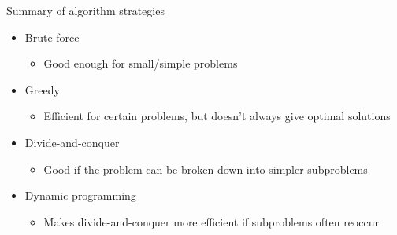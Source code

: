 \begin{frame}{Summary of algorithm strategies}
	\begin{itemize}
		\pause\item Brute force
			\begin{itemize}
				\pause\item Good enough for small/simple problems
			\end{itemize}
		\pause\item Greedy
			\begin{itemize}
				\pause\item Efficient for certain problems, but doesn't always give optimal solutions
			\end{itemize}
		\pause\item Divide-and-conquer
			\begin{itemize}
				\pause\item Good if the problem can be broken down into simpler subproblems
			\end{itemize}
		\pause\item Dynamic programming
			\begin{itemize}
				\pause\item Makes divide-and-conquer more efficient if subproblems often reoccur
			\end{itemize}
	\end{itemize}
\end{frame}

